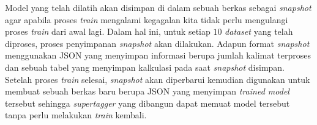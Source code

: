 Model yang telah dilatih akan disimpan di dalam sebuah berkas sebagai \textit{snapshot} agar apabila
proses \textit{train} mengalami kegagalan kita tidak perlu mengulangi proses \textit{train} dari
awal lagi.
Dalam hal ini, untuk setiap $10$ \textit{dataset} yang telah diproses, proses penyimpanan
\textit{snapshot} akan dilakukan.
Adapun format \textit{snapshot} menggunakan JSON yang menyimpan informasi berupa jumlah kalimat
terproses dan sebuah tabel yang menyimpan kalkulasi pada saat \textit{snapshot} disimpan.
Setelah proses \textit{train} selesai, \textit{snapshot} akan diperbarui kemudian digunakan
untuk membuat sebuah berkas baru berupa JSON yang menyimpan \textit{trained model} tersebut
sehingga \textit{supertagger} yang dibangun dapat memuat model tersebut tanpa perlu melakukan
\textit{train} kembali.


